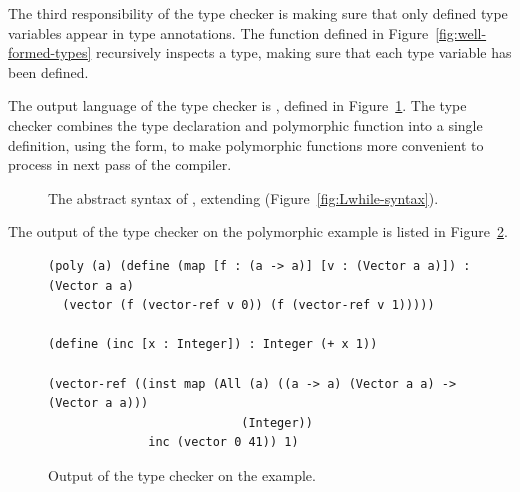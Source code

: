 \documentclass[7x10]{TimesAPriori_MIT}%
\newcommand{\gray}[1]{{\color{gray} #1}}
\begin{document}
The third responsibility of the type checker is making sure that only
defined type variables appear in type annotations. The
 function defined in
Figure~\ref{fig:well-formed-types} recursively inspects a type, making
sure that each type variable has been defined.

The output language of the type checker is \LangInst{}, defined in
Figure~\ref{fig:Rpoly-prime-syntax}. The type checker combines the type
declaration and polymorphic function into a single definition, using
the  form, to make polymorphic functions more convenient to
process in next pass of the compiler.

\begin{figure}[tp]
\centering
\fbox{
  \begin{minipage}{0.96\textwidth}
\small
\[
\begin{array}{lcl}
  \Type &::=& \ldots \MID \LP\key{All}~\LP\Var\ldots\RP~ \Type\RP \MID \Var \\
  \Exp &::=& \ldots \MID \INST{\Exp}{\Type}{\LP\Type\ldots\RP} \\
  \Def &::=& \gray{ \DEF{\Var}{\LP\LS\Var \key{:} \Type\RS \ldots\RP}{\Type}{\code{'()}}{\Exp} } \\
   &\MID& \LP\key{Poly}~\LP\Var\ldots\RP~ \DEF{\Var}{\LP\LS\Var \key{:} \Type\RS \ldots\RP}{\Type}{\code{'()}}{\Exp}\RP  \\
  \LangInst{} &::=& \gray{ \PROGRAMDEFSEXP{\code{'()}}{\LP\Def\ldots\RP}{\Exp} }
\end{array}
\]
\end{minipage}
}
\caption{The abstract syntax of \LangInst{}, extending \LangLoop{}
    (Figure~\ref{fig:Lwhile-syntax}).}
\label{fig:Rpoly-prime-syntax}
\end{figure}

The output of the type checker on the polymorphic 
example is listed in Figure~\ref{fig:map-type-check}.

\begin{figure}[tbp]
\begin{lstlisting}
(poly (a) (define (map [f : (a -> a)] [v : (Vector a a)]) : (Vector a a)
  (vector (f (vector-ref v 0)) (f (vector-ref v 1)))))

(define (inc [x : Integer]) : Integer (+ x 1))

(vector-ref ((inst map (All (a) ((a -> a) (Vector a a) -> (Vector a a)))
                           (Integer))
              inc (vector 0 41)) 1)
\end{lstlisting}
\caption{Output of the type checker on the  example.}
\label{fig:map-type-check}
\end{figure}
\end{document}
